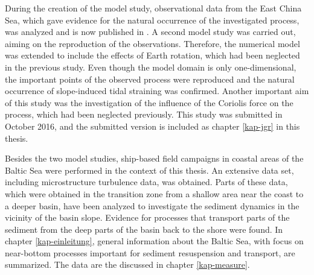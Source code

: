 During the creation of the model study, observational data from the East China 
Sea, which gave evidence for the natural occurrence of the investigated 
process, was analyzed and is now published in \cite{Endohetal2016a}. A second 
model study was carried out, aiming on the reproduction of the observations. 
Therefore, the numerical model was extended to include the effects of Earth 
rotation, which had been neglected in the previous study. Even though the model 
domain is only one-dimensional, the important points of the observed process 
were reproduced and the natural occurrence of slope-induced tidal straining was 
confirmed. Another important aim of this study was the investigation of the 
influence of the Coriolis force on the process, which had been neglected 
previously. This study was submitted in October 2016, and the submitted version 
is included as chapter \ref{kap-jgr} in this thesis.

Besides the two model studies, ship-based field campaigns in coastal areas of 
the Baltic Sea were performed in the context of this thesis. An extensive data 
set, including microstructure turbulence data, was obtained. Parts of these 
data, which were obtained in the transition zone from a shallow area near the 
coast to a deeper basin, have been analyzed to investigate the sediment 
dynamics in the vicinity of the basin slope. Evidence for processes that 
transport parts of the sediment from the deep parts of the basin back to the 
shore were found. In chapter \ref{kap-einleitung}, general information about 
the Baltic Sea, with focus on near-bottom processes important for sediment 
resuspension and transport, are summarized. The data are the discussed in 
chapter \ref{kap-measure}.